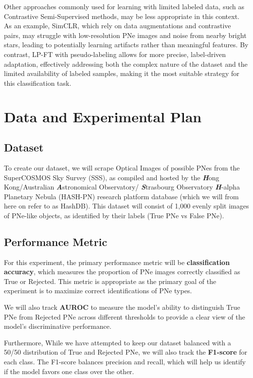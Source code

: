 \documentclass{article}
\begin{document}
Other approaches commonly used for learning with limited labeled data, such as Contrastive Semi-Supervised methods, may be less appropriate in this context. As an example, SimCLR, which rely on data augmentations and contrastive pairs, may struggle with low-resolution PNe images and noise from nearby bright stars, leading to potentially learning artifacts rather than meaningful features. By contrast, LP-FT with pseudo-labeling allows for more precise, label-driven adaptation, effectively addressing both the complex nature of the dataset and the limited availability of labeled samples, making it the most suitable strategy for this classification task.



\section{Data and Experimental Plan}

\subsection{Dataset}

To create our dataset, we will scrape Optical Images of possible PNes from the SuperCOSMOS Sky Survey (SSS), as compiled and hosted by the \textbf{\textit{H}}ong Kong/Australian \textbf{\textit{A}}stronomical Observatory/ \textbf{\textit{S}}trasbourg Observatory \textbf{\textit{H}}-alpha Planetary Nebula (HASH-PN) research platform database (which we will from here on refer to as HashDB). This dataset will consist of 1,000 evenly split images of PNe-like objects, as identified by their labels (True PNe vs False PNe).


\subsection{Performance Metric}

For this experiment, the primary performance metric will be \textbf{classification accuracy}, which measures the proportion of PNe images correctly classified as True or Rejected. This metric is appropriate as the primary goal of the experiment is to maximize correct identifications of PNe types.

We will also track \textbf{AUROC} to measure the model’s ability to distinguish True PNe from Rejected PNe across different thresholds to provide a clear view of the model's discriminative performance.

Furthermore, While we have attempted to keep our dataset balanced with a 50/50 distribution of True and Rejected PNe, we will also track the \textbf{F1-score} for each class. The F1-score balances precision and recall, which will help us identify if the model favors one class over the other.
\end{document}
